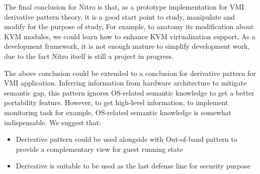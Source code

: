 The final conclusion for Nitro is that, as a prototype implementation for VMI derivative pattern theory, 
it is a good start point to study, manipulate and modify for the purpose of study, For example, 
to anatomy its modification about KVM modules, we could learn how to enhance KVM virtualization support. As a development framework, 
it is not enough mature to simplify development work, due to the fact Nitro itself is still a project in progress.

The above conclusion could be extended to a conclusion for derivative pattern for VMI application. 
Inferring information from hardware architecture to mitigate semantic gap, this pattern ignores OS-related semantic knowledge to 
get a better portability feature. However, to get high-level information, to implement monitoring task for example, OS-related semantic 
knowledge is somewhat indispensable. We suggest that:

\begin{itemize}
    \item Derivative pattern could be used alongside with Out-of-band pattern to provide a complementary view for guest running state
    \item Derivative is suitable to be used as the last defense line for security purpose
\end{itemize}


